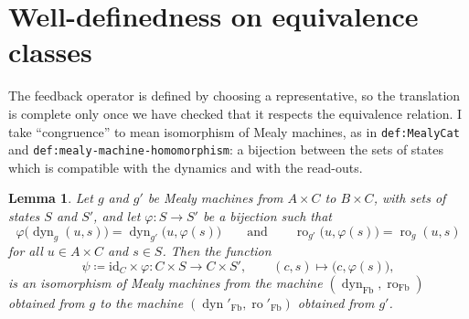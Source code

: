 \documentclass[11pt,a4paper]{article}
\theoremstyle{plain}
\newtheorem{lemma}{Lemma}
\theoremstyle{remark}
\DeclareMathOperator{\dyn}{dyn}
\DeclareMathOperator{\ro}{ro}
\DeclareMathOperator{\Fb}{Fb}
\newcommand{\id}{\mathrm{id}}
\newcommand{\lbl}[1]{\nolinkurl{#1}}
\begin{document}
\section{Well-definedness on equivalence classes}

The feedback operator is defined by choosing a representative, so the translation is complete only once we have checked that it respects the equivalence relation.
I take ``congruence'' to mean isomorphism of Mealy machines, as in \lbl{def:MealyCat} and \lbl{def:mealy-machine-homomorphism}: a bijection between the sets of states which is compatible with the dynamics and with the read-outs.

\begin{lemma}
    \label{lem:well-defined}
    Let $g$ and $g'$ be Mealy machines from $A \times C$ to $B \times C$, with sets of states $S$ and $S'$, and let $\varphi \colon S \to S'$ be a bijection such that
    \begin{equation}
        \label{eq:iso}
        \varphi\bigl(\dyn_g(u, s)\bigr) = \dyn_{g'}\bigl(u, \varphi(s)\bigr)
        \qquad \text{and} \qquad
        \ro_{g'}\bigl(u, \varphi(s)\bigr) = \ro_g(u, s)
    \end{equation}
    for all $u \in A \times C$ and $s \in S$.
    Then the function
    \begin{equation*}
        \psi \coloneqq \id_C \times \varphi \colon C \times S \to C \times S', \qquad (c, s) \mapsto \bigl(c, \varphi(s)\bigr),
    \end{equation*}
    is an isomorphism of Mealy machines from the machine $(\dyn_{\Fb}, \ro_{\Fb})$ obtained from $g$ to the machine $(\dyn'_{\Fb}, \ro'_{\Fb})$ obtained from $g'$.
\end{lemma}
\end{document}
